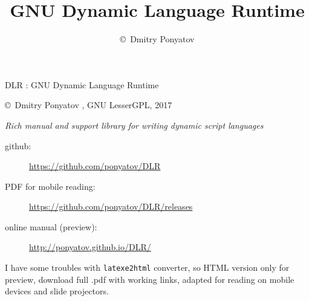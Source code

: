 

\title{GNU Dynamic Language Runtime}
\author{\copyright\ Dmitry Ponyatov }


\maketitle

{\Large DLR : GNU Dynamic Language Runtime}

\bigskip
\copyright\ Dmitry Ponyatov  , GNU LesserGPL, 2017

\bigskip
\emph{Rich manual and support library for writing dynamic script languages}  
\bigskip

\begin{description}
\item[github:] \url{https://github.com/ponyatov/DLR}
\item[PDF for mobile reading:] \url{https://github.com/ponyatov/DLR/releases}
\item[online manual (preview):] \url{http://ponyatov.github.io/DLR/}
\end{description}

\noindent
I have some troubles with \verb|latexe2html| converter, so HTML version only for
preview, download full .pdf with working links, adapted for reading on mobile
devices and slide projectors.

\tableofcontents











